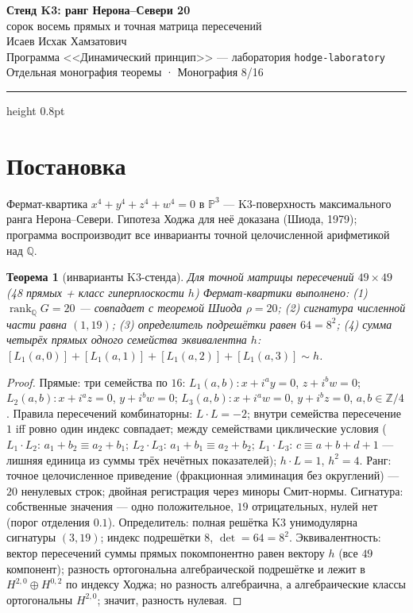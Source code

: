\documentclass[11pt,a4paper]{article}
\theoremstyle{plain}
\newtheorem{theorem}{Теорема}
\theoremstyle{definition}
\theoremstyle{remark}
\newcommand{\ZZ}{\mathbb{Z}}
\newcommand{\QQ}{\mathbb{Q}}
\newcommand{\rank}{\operatorname{rank}}
\begin{document}
\begin{center}
{\LARGE\bfseries Стенд K3: ранг Нерона–Севери 20}\\[0.4em]
{\large сорок восемь прямых и точная матрица пересечений}\\[0.6em]
{\normalsize Исаев Исхак Хамзатович}\\[0.2em]
{\small Программа <<Динамический принцип>> --- лаборатория \texttt{hodge-laboratory}}\\[0.15em]
{\small Отдельная монография теоремы · Монография 8/16}
\end{center}
\vspace{0.4em}
{\color{linkblue}\hrule height 0.8pt}
\vspace{0.8em}

\section{Постановка}

Фермат-квартика $x^4+y^4+z^4+w^4=0$ в $\mathbb{P}^3$ --- K3-поверхность
максимального ранга Нерона--Севери. Гипотеза Ходжа для неё доказана
(Шиода, 1979); программа воспроизводит все инварианты точной
целочисленной арифметикой над $\QQ$.

\begin{theorem}[инварианты K3-стенда]\label{th:k3stand}
Для точной матрицы пересечений $49\times49$ (48 прямых + класс
гиперплоскости $h$) Фермат-квартики выполнено:
(1) $\rank_\QQ G=20$ --- совпадает с теоремой Шиода $\rho=20$;
(2) сигнатура численной части равна $(1,19)$;
(3) определитель подрешётки равен $64=8^2$;
(4) сумма четырёх прямых одного семейства эквивалентна $h$:
$[L_1(a,0)]+[L_1(a,1)]+[L_1(a,2)]+[L_1(a,3)]\sim h$.
\end{theorem}

\begin{proof}
Прямые: три семейства по $16$:
$L_1(a,b)\colon x+i^ay=0$, $z+i^bw=0$;
$L_2(a,b)\colon x+i^az=0$, $y+i^bw=0$;
$L_3(a,b)\colon x+i^aw=0$, $y+i^bz=0$, $a,b\in\ZZ/4$.
Правила пересечений комбинаторны: $L\cdot L=-2$; внутри семейства
пересечение $1$ iff ровно один индекс совпадает; между семействами
циклические условия ($L_1\cdot L_2$: $a_1+b_2\equiv a_2+b_1$;
$L_2\cdot L_3$: $a_1+b_1\equiv a_2+b_2$; $L_1\cdot L_3$:
$c\equiv a+b+d+1$ --- лишняя единица из суммы трёх нечётных
показателей); $h\cdot L=1$, $h^2=4$.
Ранг: точное целочисленное приведение (фракционная элиминация без
округлений) --- $20$ ненулевых строк; двойная регистрация через
миноры Смит-нормы.
Сигнатура: собственные значения --- одно положительное, $19$
отрицательных, нулей нет (порог отделения $0.1$).
Определитель: полная решётка K3 унимодулярна сигнатуры $(3,19)$;
индекс подрешётки $8$, $\det=64=8^2$.
Эквивалентность: вектор пересечений суммы прямых покомпонентно равен
вектору $h$ (все $49$ компонент); разность ортогональна
алгебраической подрешётке и лежит в $H^{2,0}\oplus H^{0,2}$ по
индексу Ходжа; но разность алгебраична, а алгебраические классы
ортогональны $H^{2,0}$; значит, разность нулевая.
\end{proof}
\end{document}
